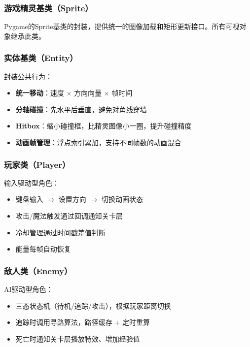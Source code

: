 \documentclass[12pt,a4paper]{article}
\begin{document}
\subsubsection{游戏精灵基类（Sprite）}

Pygame的Sprite基类的封装，提供统一的图像加载和矩形更新接口。所有可视对象继承此类。

\subsubsection{实体基类（Entity）}

封装公共行为：
\begin{itemize}[leftmargin=2em]
    \item \textbf{统一移动}：速度 $\times$ 方向向量 $\times$ 帧时间
    \item \textbf{分轴碰撞}：先水平后垂直，避免对角线穿墙
    \item \textbf{Hitbox}：缩小碰撞框，比精灵图像小一圈，提升碰撞精度
    \item \textbf{动画帧管理}：浮点索引累加，支持不同帧数的动画混合
\end{itemize}

\subsubsection{玩家类（Player）}

输入驱动型角色：
\begin{itemize}[leftmargin=2em]
    \item 键盘输入 $\rightarrow$ 设置方向 $\rightarrow$ 切换动画状态
    \item 攻击/魔法触发通过回调通知关卡层
    \item 冷却管理通过时间戳差值判断
    \item 能量每帧自动恢复
\end{itemize}

\subsubsection{敌人类（Enemy）}

AI驱动型角色：
\begin{itemize}[leftmargin=2em]
    \item 三态状态机（待机/追踪/攻击），根据玩家距离切换
    \item 追踪时调用寻路算法，路径缓存 + 定时重算
    \item 死亡时通知关卡层播放特效、增加经验值
\end{itemize}
\end{document}

